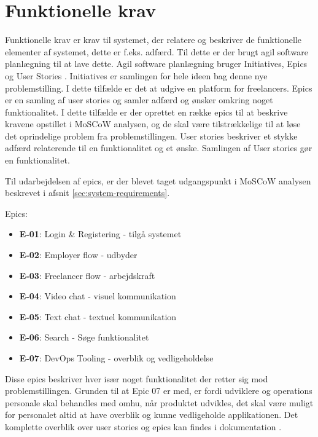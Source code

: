 \section{Funktionelle krav}

Funktionelle krav er krav til systemet, der relatere og beskriver de funktionelle elementer af systemet, dette er f.eks. adfærd. Til dette er der brugt agil software planlægning til at lave dette. Agil software planlægning bruger Initiatives, Epics og User Stories . Initiatives er samlingen for hele ideen bag denne nye problemstilling. I dette tilfælde er det at udgive en platform for freelancers. Epics er en samling af user stories og samler adfærd og ønsker omkring noget funktionalitet. I dette tilfælde er der oprettet en række epics til at beskrive kravene opstillet i MoSCoW analysen, og de skal være tilstrækkelige til at løse det oprindelige problem fra problemstillingen. User stories beskriver et stykke adfærd relaterende til en funktionalitet og et ønske. Samlingen af User stories gør en funktionalitet.

Til udarbejdelsen af epics, er der blevet taget udgangspunkt i MoSCoW analysen beskrevet i afsnit \ref{sec:system-requirements}.

Epics:

\begin{itemize}
  \item \textbf{E-01}: Login \& Registering - tilgå systemet
  \item \textbf{E-02}: Employer flow - udbyder
  \item \textbf{E-03}: Freelancer flow - arbejdskraft
  \item \textbf{E-04}: Video chat - visuel kommunikation
  \item \textbf{E-05}: Text chat - textuel kommunikation
  \item \textbf{E-06}: Search - Søge funktionalitet
  \item \textbf{E-07}: DevOps Tooling - overblik og vedligeholdelse 
\end{itemize}

Disse epics beskriver hver især noget funktionalitet der retter sig mod problemstillingen. Grunden til at Epic 07 er med, er fordi udviklere og operations personale skal behandles med omhu, når produktet udvikles, det skal være muligt for personalet altid at have overblik og kunne vedligeholde applikationen. Det komplette overblik over user stories og epics kan findes i dokumentation .